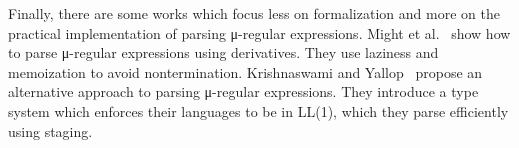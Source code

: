 Finally, there are some works which focus less on formalization and more on the
practical implementation of parsing μ-regular expressions.
Might et al.~\cite{parsing-with-derivatives} show how to parse μ-regular
 expressions using derivatives.
They use laziness and memoization to avoid nontermination.
Krishnaswami and Yallop~\cite{yallop} propose an alternative approach to parsing
μ-regular expressions.
They introduce a type system which enforces their languages to be in LL(1),
which they parse efficiently using staging. 